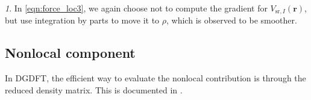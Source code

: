 \documentclass{article}
\newcommand{\bvec}[1]{\mathbf{#1}}
\newcommand{\vr}{\bvec{r}}
\theoremstyle{plain}
\theoremstyle{remark}
\newtheorem{rem}[thm]{\protect\remarkname}
\theoremstyle{plain}
\theoremstyle{plain}
\theoremstyle{plain}
\providecommand{\remarkname}{Remark}
\begin{document}
\begin{rem}
In \cref{eqn:force_loc3}, we again choose not to compute the gradient for $V_{\text{sr},I}(\vr)$, but use integration by parts to move it to $\rho$, which is observed to be smoother. 
\end{rem}

\subsection{Nonlocal component}

In DGDFT, the efficient way to evaluate the nonlocal contribution is through the reduced density matrix. This is documented in \cite[Eq. (29)]{ZhangLinHuEtAl2017}.



\end{document}
